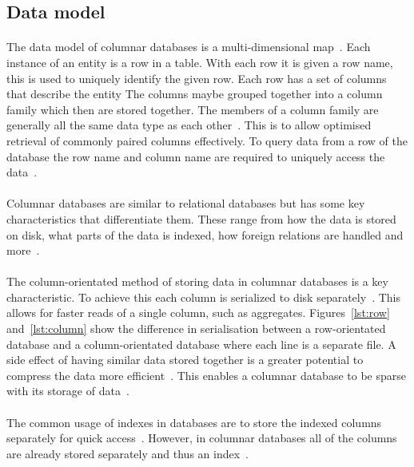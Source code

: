 \documentclass{CRPITStyle}
\renewcommand{\cite}{\citep}
\begin{document}
\subsection{Data model}

\paragraph{}
The data model of columnar databases is a multi-dimensional
map~\cite{bigtable,nosql_eval}.
Each instance of an entity is a row in a table.
With each row it is given a row name, this is used to uniquely identify the
given row.
Each row has a set of columns that describe the entity
The columns maybe grouped together into a column family which then are
stored together.
The members of a column family are generally all the same data type as each
other~\cite{bigtable}.
This is to allow optimised retrieval of commonly paired columns effectively.
To query data from a row of the database the row name and column name are
required to uniquely access the data~\cite{bigtable}.

\paragraph{}
Columnar databases are similar to relational databases but has some key
characteristics that differentiate them.
These range from how the data is stored on disk, what parts of the
data is indexed, how foreign relations are handled and more~\cite{nosql_survey}.

\paragraph{}
The column-orientated method of storing data in columnar databases is a
key characteristic.
To achieve this each column is serialized to disk
separately~\cite{bigtable,nosql_survey}.
This allows for faster reads of a single column, such as aggregates.
Figures~\ref{lst:row} and~\ref{lst:column} show the difference in serialisation
between a row-orientated database and a column-orientated database where each
line is a separate file.
A side effect of having similar data stored together is a greater potential to
compress the data more efficient~\cite{nosql_survey}.
This enables a columnar database to be sparse with its storage of data~\cite{bigtable}.

\paragraph{}
The common usage of indexes in databases are to store the indexed columns
separately for quick access~\cite{relational_db}.
However, in columnar databases all of the columns are already stored
separately and thus an index~\cite{nosql_survey}.
\end{document}
